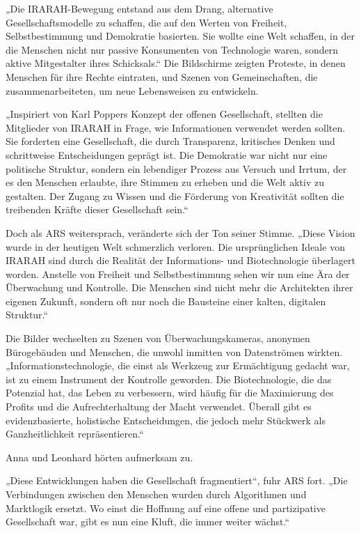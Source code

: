 \documentclass[
]{article}
\begin{document}
„Die IRARAH-Bewegung entstand aus dem Drang, alternative Gesellschaftsmodelle zu schaffen, die auf den Werten von Freiheit, Selbstbestimmung und Demokratie basierten. Sie wollte eine Welt schaffen, in der die Menschen nicht nur passive Konsumenten von Technologie waren, sondern aktive Mitgestalter ihres Schicksals.`` Die Bildschirme zeigten Proteste, in denen Menschen für ihre Rechte eintraten, und Szenen von Gemeinschaften, die zusammenarbeiteten, um neue Lebensweisen zu entwickeln.

„Inspiriert von Karl Poppers Konzept der offenen Gesellschaft, stellten die Mitglieder von IRARAH in Frage, wie Informationen verwendet werden sollten. Sie forderten eine Gesellschaft, die durch Transparenz, kritisches Denken und schrittweise Entscheidungen geprägt ist. Die Demokratie war nicht nur eine politische Struktur, sondern ein lebendiger Prozess aus Versuch und Irrtum, der es den Menschen erlaubte, ihre Stimmen zu erheben und die Welt aktiv zu gestalten. Der Zugang zu Wissen und die Förderung von Kreativität sollten die treibenden Kräfte dieser Gesellschaft sein.``

Doch als ARS weitersprach, veränderte sich der Ton seiner Stimme. „Diese Vision wurde in der heutigen Welt schmerzlich verloren. Die ursprünglichen Ideale von IRARAH sind durch die Realität der Informations- und Biotechnologie überlagert worden. Anstelle von Freiheit und Selbstbestimmung sehen wir nun eine Ära der Überwachung und Kontrolle. Die Menschen sind nicht mehr die Architekten ihrer eigenen Zukunft, sondern oft nur noch die Bausteine einer kalten, digitalen Struktur.``

Die Bilder wechselten zu Szenen von Überwachungskameras, anonymen Bürogebäuden und Menschen, die unwohl inmitten von Datenströmen wirkten. „Informationstechnologie, die einst als Werkzeug zur Ermächtigung gedacht war, ist zu einem Instrument der Kontrolle geworden. Die Biotechnologie, die das Potenzial hat, das Leben zu verbessern, wird häufig für die Maximierung des Profits und die Aufrechterhaltung der Macht verwendet. Überall gibt es evidenzbasierte, holistische Entscheidungen, die jedoch mehr Stückwerk als Ganzheitlichkeit repräsentieren.``

Anna und Leonhard hörten aufmerksam zu.

„Diese Entwicklungen haben die Gesellschaft fragmentiert``, fuhr ARS fort. „Die Verbindungen zwischen den Menschen wurden durch Algorithmen und Marktlogik ersetzt. Wo einst die Hoffnung auf eine offene und partizipative Gesellschaft war, gibt es nun eine Kluft, die immer weiter wächst.``
\end{document}
